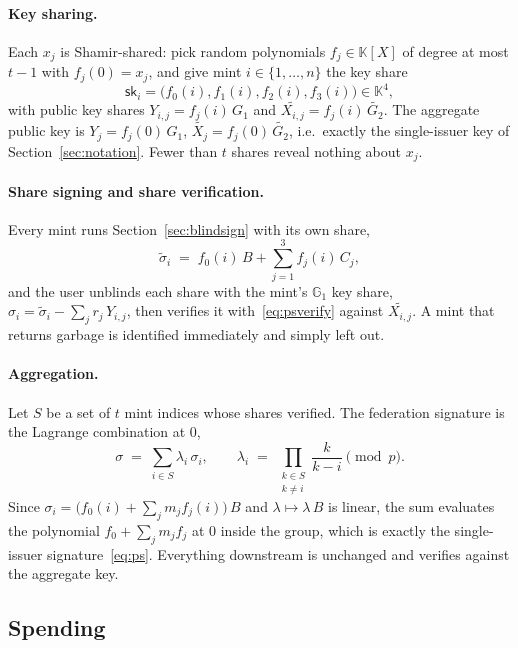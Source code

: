 \documentclass[10pt,a5paper]{article}
\newcommand{\K}[1]{#1}                      %
\newcommand{\Go}[1]{#1}                     %
\newcommand{\Gt}[1]{\tilde{#1}}             %
\newcommand{\K}[1]{{\color{ScalarCol}#1}}   %
\newcommand{\Go}[1]{{\color{GoneCol}#1}}    %
\newcommand{\Gt}[1]{{\color{GtwoCol}#1}}    %
\newcommand{\F}{\mathbb{K}}
\newcommand{\GG}[1]{\mathbb{G}_{#1}}
\begin{document}
\paragraph{Key sharing.}
Each $\K{x_j}$ is Shamir-shared: pick random polynomials $f_j \in \F[X]$ of
degree at most $t-1$ with $f_j(0) = \K{x_j}$, and give mint
$i \in \{1,\dots,n\}$ the key share
\[
  \mathsf{sk}_i = \bigl(\K{f_0(i)}, \K{f_1(i)}, \K{f_2(i)}, \K{f_3(i)}\bigr) \in \F^4,
\]
with public key shares $\Go{Y_{i,j}} = \K{f_j(i)}\,\Go{G_1}$ and
$\Gt{X_{i,j}} = \K{f_j(i)}\,\Gt{G_2}$. The aggregate public key is
$\Go{Y_j} = \K{f_j(0)}\,\Go{G_1}$, $\Gt{X_j} = \K{f_j(0)}\,\Gt{G_2}$, i.e.\ exactly
the single-issuer key of Section~\ref{sec:notation}. Fewer than $t$ shares
reveal nothing about $\K{x_j}$.

\paragraph{Share signing and share verification.}
Every mint runs Section~\ref{sec:blindsign} with its own share,
\[
  \Go{\widetilde{\sigma}_i} \;=\; \K{f_0(i)}\,\Go{B} + \sum_{j=1}^{3} \K{f_j(i)}\,\Go{C_j},
\]
and the user unblinds each share with the mint's $\GG{1}$ key share,
$\Go{\sigma_i} = \Go{\widetilde{\sigma}_i} - \sum_j \K{r_j}\,\Go{Y_{i,j}}$, then
verifies it with~\eqref{eq:psverify} against $\Gt{X_{i,j}}$. A mint that
returns garbage is identified immediately and simply left out.

\paragraph{Aggregation.}
Let $S$ be a set of $t$ mint indices whose shares verified. The federation
signature is the Lagrange combination at $0$,
\begin{equation}
  \Go{\sigma} \;=\; \sum_{i \in S} \K{\lambda_i}\,\Go{\sigma_i},
  \qquad
  \K{\lambda_i} \;=\; \prod_{\substack{k \in S \\ k \neq i}} \frac{k}{k - i} \pmod p .
  \label{eq:lagrange}
\end{equation}
Since $\Go{\sigma_i} = \bigl(f_0(i) + \sum_j \K{m_j} f_j(i)\bigr)\,\Go{B}$ and
$\K{\lambda} \mapsto \K{\lambda}\,\Go{B}$ is linear, the sum evaluates the
polynomial $f_0 + \sum_j \K{m_j} f_j$ at $0$ inside the group, which is exactly
the single-issuer signature~\eqref{eq:ps}. Everything downstream is unchanged
and verifies against the aggregate key.

\subsection{Spending}
\label{sec:spend}
\end{document}
